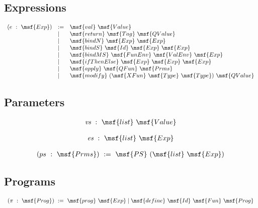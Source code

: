 \documentclass{article}
\begin{document}
\subsection{Expressions}

\begin{gather}
\begin{array}{lll}
  (e \ : \ \msf{Exp}) & := & 
%
   \msf{val} \ \msf{Value} \\
%
 & \mid & \msf{return} \ \msf{Tag} \ \msf{QValue} \\
%
  & \mid & \msf{bindN} \ \msf{Exp} \ \msf{Exp} \\
%
  & \mid & \msf{bindS} \ \msf{Id} \ \msf{Exp} \ \msf{Exp} \\
% 
  & \mid & \msf{bindMS} \ \msf{FunEnv} \ \msf{ValEnv} \ \msf{Exp} \\
%
  & \mid & \msf{ifThenElse} \ \msf{Exp} \ \msf{Exp} \ \msf{Exp} \\
%
  & \mid & \msf{apply} \ \msf{QFun} \ \msf{Prms} \\ 
%    
  & \mid & \msf{modify} \ (\msf{XFun} \ \msf{Type} \ \msf{Type}) \
   \msf{QValue}
\end{array}
\end{gather}



\subsection{Parameters}


\begin{gather}
  \mbox{\it vs} \ : \ \msf{list} \ \msf{Value}
\end{gather}


\begin{gather}
  \mbox{\it es} \ : \ \msf{list} \ \msf{Exp}
\end{gather}


\begin{gather}
  (ps \ : \ \msf{Prms}) \ := \ \msf{PS} \ (\msf{list} \ \msf{Exp})
\end{gather}




\subsection{Programs}

\begin{gather}
\begin{array}{lll}
  (\pi \ : \ \msf{Prog}) \ := \
%
  \msf{prog} \ \msf{Exp} 
%
   \mid \msf{define} \ \msf{Id} \ \msf{Fun} \ \msf{Prog} 
%
\end{array}
\end{gather}
\end{document}
